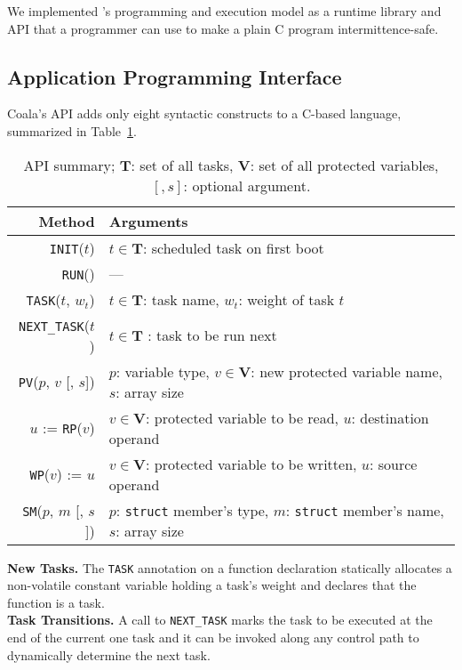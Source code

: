We implemented \sys's programming and execution model as a runtime library and API that a programmer can use to make a plain C program intermittence-safe.
%
\subsection{Application Programming Interface}
\label{sec:coala_api}
%
Coala's API adds only eight syntactic constructs to a C-based language, summarized
in Table~\ref{table:coala_api}.
%
\begin{table}
\centering
\begin{tabular}{| r | p{} |}
	\hline
	{Method} & {Arguments} \\
	\hline\hline
	\texttt{INIT}($t$) & $t \in \mathbf{T}$: scheduled task on first boot \\
	\hline
	\texttt{RUN}() & --- \\
	\hline
	\texttt{TASK}($t$, $w_t$) & $t \in \mathbf{T}$: task name, $w_t$: weight of task $t$ \\
	\hline
	\texttt{NEXT\_TASK}($t$) & $t \in \mathbf{T}$ : task to be run next \\
	\hline
	\texttt{PV}($p$, $v$ [, $s$]) & $p$: variable type, $v \in \mathbf{V}$: new protected variable name, $s$: array size \\
	\hline
	$u$ := \texttt{RP}($v$) & $v \in \mathbf{V}$: protected variable to be read, $u$: destination operand \\
	\hline	
	\texttt{WP}($v$) := $u$ &  $v \in \mathbf{V}$: protected variable to be written, $u$: source operand \\
	\hline
	\texttt{SM}($p$, $m$ [, $s$]) & $p$: \texttt{struct} member's type, $m$: \texttt{struct} member's name, $s$: array size \\
	\hline
\end{tabular}
\caption{API summary; $\mathbf{T}$: set of all tasks, $\mathbf{V}$: set of all protected variables, $[, s]$: optional argument.}
\label{table:coala_api}
\end{table}
%
\noindent\textbf{New Tasks.} The \texttt{TASK} annotation on a function
declaration statically allocates a non-volatile constant variable holding a
task's weight and declares that the function is a task.\\
%
\noindent\textbf{Task Transitions.} A call to \texttt{NEXT\_TASK} marks the task to be executed at the 
end of the current one task and it can be invoked along
any control path to dynamically determine the next task.\\
